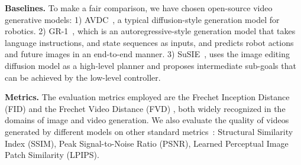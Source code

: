 \textbf{Baselines.} 
To make a fair comparison, we have chosen open-source video generative models: 
1) AVDC~\citep{ko2023learning}, a typical diffusion-style generation model for robotics.
2) GR-1~\citep{Wu2023UnleashingLV}, which is an autoregressive-style generation model that takes language instructions, and state sequences as inputs, and predicts robot actions and future images in an end-to-end manner. 
3) SuSIE~\citep{black2023zero}, uses the image editing diffusion model as a high-level planner and proposes intermediate sub-goals that can be achieved by the low-level controller.


\textbf{Metrics.} 
The evaluation metrics employed are the Frechet Inception Distance (FID) \citep{Seitzer2020FID} and the Frechet Video Distance (FVD) \citep{stylegan_v,digan}, both widely recognized in the domains of image and video generation.
We also evaluate the quality of videos generated by different models on other standard metrics~\citep{bu2024closed}: Structural Similarity Index (SSIM), Peak Signal-to-Noise Ratio (PSNR), Learned Perceptual Image Patch Similarity (LPIPS).




